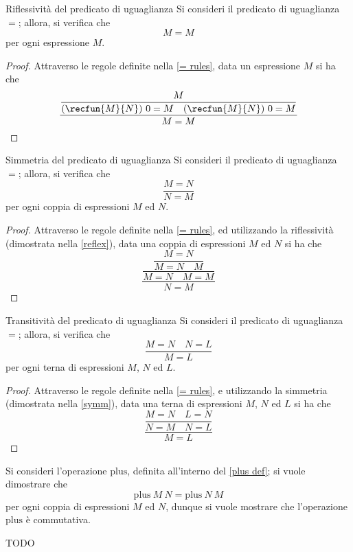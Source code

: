 \documentclass[a4paper, 12pt]{report}
\begin{document}
    \begin{framedprop}[label={reflex}]{Riflessività del predicato di uguaglianza}
        Si consideri il predicato di uguaglianza $=$; allora, si verifica che $$M = M$$ per ogni espressione $M$.
    \end{framedprop}

    \begin{proof}
        Attraverso le regole definite nella \cref{= rules}, data un espressione $M$ si ha che $$\dfrac{\dfrac{M}{(\recfun{M}{N}) \ 0 = M \quad (\recfun{M}{N}) \ 0 = M }}{M = M}$$
    \end{proof}

    \begin{framedprop}[label={= symm}]{Simmetria del predicato di uguaglianza}
        Si consideri il predicato di uguaglianza $=$; allora, si verifica che $$\dfrac{M = N}{N = M}$$ per ogni coppia di espressioni $M$ ed $N$.
    \end{framedprop}

    \begin{proof}
        Attraverso le regole definite nella \cref{= rules}, ed utilizzando la riflessività (dimostrata nella \cref{reflex}), data una coppia di espressioni $M$ ed $N$ si ha che $$\dfrac{\dfrac{\dfrac{M = N}{M = N \quad M}}{M = N \quad M = M}}{N = M}$$
    \end{proof}

    \begin{framedprop}[label={= trans}]{Transitività del predicato di uguaglianza}
        Si consideri il predicato di uguaglianza $=$; allora, si verifica che $$\dfrac{M = N \quad N = L}{M = L}$$ per ogni terna di espressioni $M$, $N$ ed $L$.
    \end{framedprop}

    \begin{proof}
        Attraverso le regole definite nella \cref{= rules}, e utilizzando la simmetria (dimostrata nella \cref{symm}), data una terna di espressioni $M$, $N$ ed $L$ si ha che $$\dfrac{\dfrac{M = N \quad L = N}{N = M \quad N = L}}{M = L}$$
    \end{proof}

    \begin{example}
        Si consideri l'operazione $\mathrm{plus}$, definita all'interno del \cref{plus def}; si vuole dimostrare che $$\mathrm{plus} \ M \ N = \mathrm{plus} \ N \ M$$ per ogni coppia di espressioni $M$ ed $N$, dunque si vuole mostrare che l'operazione $\mathrm{plus}$ è commutativa.

        TODO
    \end{example}
\end{document}

